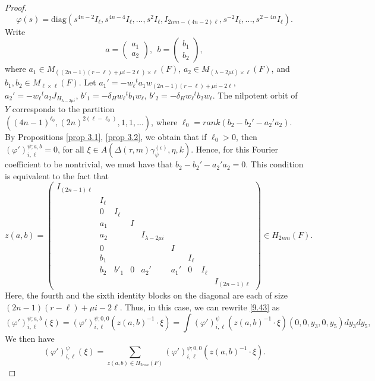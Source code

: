 \documentclass[12pts]{amsart}
\newcommand{\diag}{{\mathrm{diag}}}
\begin{document}
\begin{proof}
$$$$
$$
\varphi(s)=\diag(s^{4n-2}I_\ell,s^{4n-4}I_\ell,...,s^2I_\ell, 
I_{2nm-(4n-2)\ell},s^{-2}I_\ell,...,s^{2-4n}I_\ell).
$$
Write
$$
a=\begin{pmatrix}a_1\\a_2\end{pmatrix},\ \ b=\begin{pmatrix}b_1\\b_2\end{pmatrix},
$$
where $a_1\in M_{((2n-1)(r-\ell)+\mu i-2\ell)\times \ell}(F)$, $a_2\in M_{(\lambda-2\mu i)\times\ell}(F)$, and $b_1,b_2\in M_{\ell\times\ell}(F)$. Let $a_1'=-w_\ell{}^ta_1w_{(2n-1)(r-\ell)+\mu i-2\ell}$, $a_2'=-w_\ell{}^ta_2J_{H_{\lambda-2\mu i}}$, $b'_1=-\delta_Hw_\ell{}^tb_1w_\ell$, $b'_2=-\delta_Hw_\ell{}^tb_2w_\ell$. 
The nilpotent orbit of $Y$ corresponds to the partition\\  $((4n-1)^{\ell_0},(2n)^{2(\ell-\ell_0)},1,1,...)$, where $\ell_0=rank(b_2-b_2'-a_2'a_2)$.
By Propositions \ref{prop 3.1}, \ref{prop 3.2}, we obtain that if $\ell_0>0$, then
$(\varphi')_{i,\ell}^{\psi;a,b}=0$, for all $\xi\in A(\Delta(\tau,m)\gamma_\psi^{(\epsilon)},\eta,k)$. Hence, for this Fourier coefficient to be nontrivial, we must have that $b_2-b_2'-a_2'a_2=0$. This condition is equivalent to the fact that
\begin{equation}\label{9.45}
z(a,b)=\begin{pmatrix}I_{(2n-1)\ell}\\&I_\ell\\&0&I_\ell\\&a_1&&I\\&a_2&&&I_{\lambda-2\mu i}\\&0&&&&I\\&b_1&&&&&I_\ell\\&b_2&b'_1&0&a_2'&a_1'&0&I_\ell\\&&&&&&&&I_{(2n-1)\ell}\end{pmatrix}\in H_{2nm}(F).
\end{equation}
Here, the fourth and the sixth identity blocks on the diagonal are each of size $(2n-1)(r-\ell)+\mu i-2\ell$. Thus, in this case, we can rewrite \eqref{9.43} as
\begin{equation}\label{9.46}
(\varphi')_{i,\ell}^{\psi;a,b}(\xi)=(\varphi')_{i,\ell}^{\psi;0,0}(z(a,b)^{-1}\cdot\xi)=\int (\varphi')_{i,\ell}^\psi(z(a,b)^{-1}\cdot \xi)(0,0,y_3,0,y_5)dy_3dy_5,
\end{equation} 
We then have
\begin{equation}\label{9.47} 
(\varphi')_{i,\ell}^\psi(\xi)=\sum_{z(a,b)\in H_{2nm}(F)}(\varphi')_{i,\ell}^{\psi;0,0}(z(a,b)^{-1}\cdot\xi).

\end{equation}
\end{proof}
\end{document}
